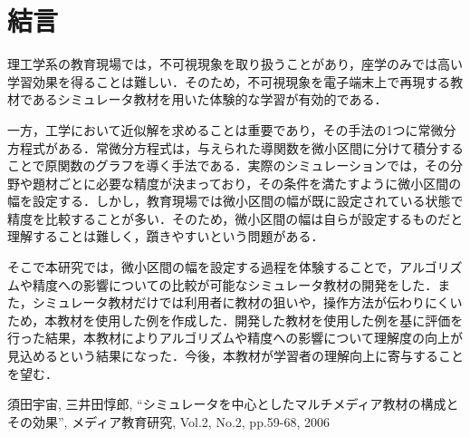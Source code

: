 \documentclass[a4paper, 12pt]{ltjsarticle}
\begin{document}
\begin{table}[htbp]
\centering
\caption{質問内容と評価}
\label{tb:質問内容と評価}
\end{table}


\clearpage
\section{結言}
理工学系の教育現場では，不可視現象を取り扱うことがあり，座学のみでは高い学習効果を得ることは難しい．そのため，不可視現象を電子端末上で再現する教材であるシミュレータ教材を用いた体験的な学習が有効的である\cite{suda2018}．

一方，工学において近似解を求めることは重要であり，その手法の1つに常微分方程式がある．常微分方程式は，与えられた導関数を微小区間に分けて積分することで原関数のグラフを導く手法である．実際のシミュレーションでは，その分野や題材ごとに必要な精度が決まっており，その条件を満たすように微小区間の幅を設定する．しかし，教育現場では微小区間の幅が既に設定されている状態で精度を比較することが多い．そのため，微小区間の幅は自らが設定するものだと理解することは難しく，躓きやすいという問題がある．

そこで本研究では，微小区間の幅を設定する過程を体験することで，アルゴリズムや精度への影響についての比較が可能なシミュレータ教材の開発をした．また，シミュレータ教材だけでは利用者に教材の狙いや，操作方法が伝わりにくいため，本教材を使用した例を作成した．開発した教材を使用した例を基に評価を行った結果，本教材によりアルゴリズムや精度への影響について理解度の向上が見込めるという結果になった．今後，本教材が学習者の理解向上に寄与することを望む．
\clearpage

\begin{thebibliography}{99}
 須田宇宙, 三井田惇郎, ``シミュレータを中心としたマルチメディア教材の構成とその効果'', メディア教育研究, Vol.2, No.2, pp.59-68, 2006
\end{thebibliography}
\end{document}
